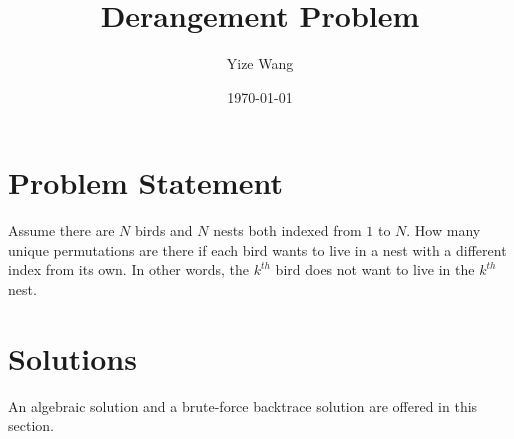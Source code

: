 \documentclass[12pt]{article}
\title{Derangement Problem}
\author{Yize Wang}
\date{\today}
\begin{document}
\maketitle
\pagebreak

\section{Problem Statement}
Assume there are $N$ birds and $N$ nests both indexed from $1$ to $N$. How many unique permutations are there if each bird wants to live in a nest with a different index from its own. In other words, the $k^{th}$ bird does not want to live in the $k^{th}$ nest.

\section{Solutions}
An algebraic solution and a brute-force backtrace solution are offered in this section.
\end{document}
